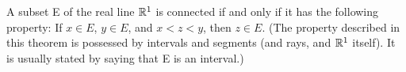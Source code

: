 \begin{theorem} %
  \label{thm:chap2:connected_R1_iff_interval}
  A subset E of the real line $\mathbb{R}^1$ is connected if and only if it
  has the following property: If $x \in E$, $y \in E$, and $x < z <
  y$, then $z \in E$.
  (The property described in this theorem is possessed by intervals
    and segments (and rays, and $\mathbb{R}^1$ itself). It is usually stated by
  saying that E is an interval.)
\end{theorem}


